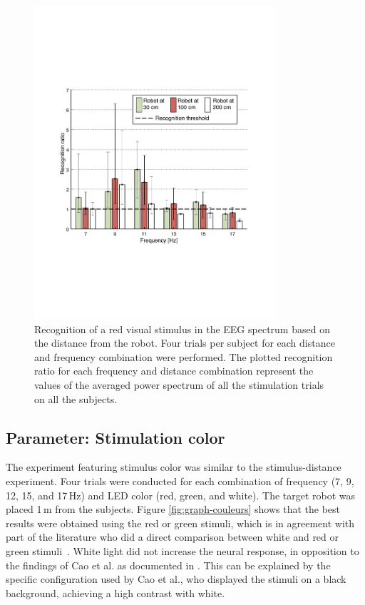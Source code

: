\documentclass[smallextended]{svjour3}
\begin{document}
\begin{figure}
\center
\includegraphics[width=0.8\textwidth]{figures/distance-v2.pdf}
\caption{Recognition of a red visual stimulus in the EEG spectrum based on the distance from the robot. Four trials per subject for each distance and frequency combination were performed. The plotted recognition ratio for each frequency and distance combination represent the values of the averaged power spectrum of all the stimulation trials on all the subjects.}
\label{fig:graph-distances}
\end{figure}
\subsection{Parameter: Stimulation color}
The experiment featuring stimulus color was similar to the stimulus-distance experiment. 
Four trials were conducted for each combination of frequency (7, 9, 12, 15, and 17\,Hz) and LED color (red, green, and white). The target robot was placed 1\,m from the subjects. 
Figure \ref{fig:graph-couleurs} shows that the best results were obtained using the red or green stimuli, which is in agreement with part of the literature who did a direct comparison between white and red or green stimuli~\cite{chua2004effects,duvinage2013performance,Faller2010,hvaring2014comparison}. White light did not increase the neural response, in opposition to the findings of Cao et al. as documented in \cite{cao2012flashing}. This can be explained by the specific configuration used by Cao et al., who displayed the stimuli on a black background, achieving a high contrast with white.
\end{document}
